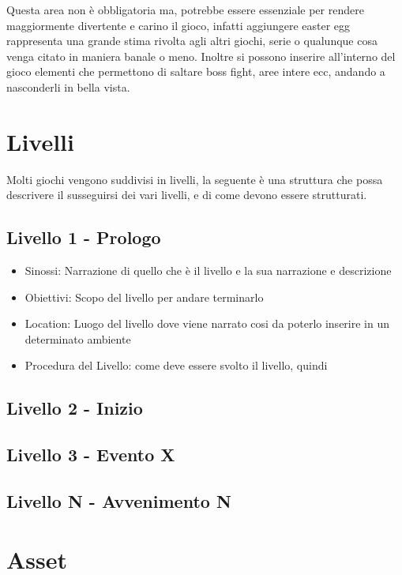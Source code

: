 \documentclass{report}
\begin{document}
\begin{itemize}
    Questa area non è obbligatoria ma, potrebbe essere essenziale per rendere maggiormente divertente e carino il gioco, infatti aggiungere easter egg rappresenta una grande stima rivolta agli altri giochi, serie o qualunque cosa venga citato in maniera banale o meno. Inoltre si possono inserire all'interno del gioco elementi che permettono di saltare boss fight, aree intere ecc, andando a nasconderli in bella vista.
\end{itemize}

\newpage

\section{Livelli}

Molti giochi vengono suddivisi in livelli, la seguente è una struttura che possa descrivere il susseguirsi dei vari livelli, e di come devono essere strutturati.

\subsection{Livello 1 - Prologo}
\begin{itemize}
    \item Sinossi: Narrazione di quello che è il livello e la sua narrazione e descrizione
    \item Obiettivi: Scopo del livello per andare terminarlo
    \item Location: Luogo del livello dove viene narrato cosi da poterlo inserire in un determinato ambiente
    \item Procedura del Livello: come deve essere svolto il livello, quindi 
\end{itemize}

\subsection{Livello 2 - Inizio}
\subsection{Livello 3 - Evento X}
\subsection{Livello N - Avvenimento N}

\newpage

\section{Asset}
\end{document}
